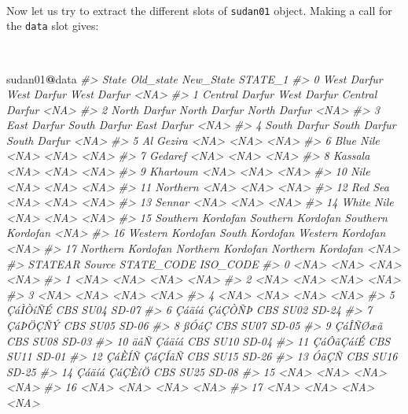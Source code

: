 \documentclass[12pt,a4paper,a4paper]{book}
\newenvironment{Shaded}{\begin{snugshade}}{\end{snugshade}}
\newcommand{\CommentTok}[1]{\textcolor[rgb]{0.56,0.35,0.01}{\textit{#1}}}
\newcommand{\OperatorTok}[1]{\textcolor[rgb]{0.81,0.36,0.00}{\textbf{#1}}}
\newcommand{\NormalTok}[1]{#1}
\theoremstyle{definition}
\theoremstyle{definition}
\theoremstyle{definition}
\theoremstyle{remark}
\begin{document}
~

Now let us try to extract the different slots of \texttt{sudan01}
object. Making a call for the \texttt{data} slot gives:

~

\begin{Shaded}
\begin{Highlighting}[]
\NormalTok{sudan01}\OperatorTok{@}\NormalTok{data}
\CommentTok{#>                State         Old_state         New_State STATE_1}
\CommentTok{#> 0        West Darfur       West Darfur       West Darfur    <NA>}
\CommentTok{#> 1     Central Darfur       West Darfur    Central Darfur    <NA>}
\CommentTok{#> 2       North Darfur      North Darfur      North Darfur    <NA>}
\CommentTok{#> 3        East Darfur      South Darfur       East Darfur    <NA>}
\CommentTok{#> 4       South Darfur      South Darfur      South Darfur    <NA>}
\CommentTok{#> 5          Al Gezira              <NA>              <NA>    <NA>}
\CommentTok{#> 6          Blue Nile              <NA>              <NA>    <NA>}
\CommentTok{#> 7            Gedaref              <NA>              <NA>    <NA>}
\CommentTok{#> 8            Kassala              <NA>              <NA>    <NA>}
\CommentTok{#> 9           Khartoum              <NA>              <NA>    <NA>}
\CommentTok{#> 10              Nile              <NA>              <NA>    <NA>}
\CommentTok{#> 11          Northern              <NA>              <NA>    <NA>}
\CommentTok{#> 12           Red Sea              <NA>              <NA>    <NA>}
\CommentTok{#> 13            Sennar              <NA>              <NA>    <NA>}
\CommentTok{#> 14        White Nile              <NA>              <NA>    <NA>}
\CommentTok{#> 15 Southern Kordofan Southern Kordofan Southern Kordofan    <NA>}
\CommentTok{#> 16  Western Kordofan    South Kordofan  Western Kordofan    <NA>}
\CommentTok{#> 17 Northern Kordofan Northern Kordofan Northern Kordofan    <NA>}
\CommentTok{#>         STATEAR Source STATE_CODE ISO_CODE}
\CommentTok{#> 0          <NA>   <NA>       <NA>     <NA>}
\CommentTok{#> 1          <NA>   <NA>       <NA>     <NA>}
\CommentTok{#> 2          <NA>   <NA>       <NA>     <NA>}
\CommentTok{#> 3          <NA>   <NA>       <NA>     <NA>}
\CommentTok{#> 4          <NA>   <NA>       <NA>     <NA>}
\CommentTok{#> 5       ÇáÌÒíÑÉ    CBS       SU04    SD-07}
\CommentTok{#> 6  Çáäíá ÇáÇÒÑÞ    CBS       SU02    SD-24}
\CommentTok{#> 7       ÇáÞÖÇÑÝ    CBS       SU05    SD-06}
\CommentTok{#> 8          ßÓáÇ    CBS       SU07    SD-05}
\CommentTok{#> 9       ÇáÎÑØæã    CBS       SU08    SD-03}
\CommentTok{#> 10    äåÑ Çáäíá    CBS       SU10    SD-04}
\CommentTok{#> 11     ÇáÔãÇáíÉ    CBS       SU11    SD-01}
\CommentTok{#> 12 ÇáÈÍÑ ÇáÇÍãÑ    CBS       SU15    SD-26}
\CommentTok{#> 13         ÓäÇÑ    CBS       SU16    SD-25}
\CommentTok{#> 14 Çáäíá ÇáÇÈíÖ    CBS       SU25    SD-08}
\CommentTok{#> 15         <NA>   <NA>       <NA>     <NA>}
\CommentTok{#> 16         <NA>   <NA>       <NA>     <NA>}
\CommentTok{#> 17         <NA>   <NA>       <NA>     <NA>}
\end{Highlighting}
\end{Shaded}
\end{document}
